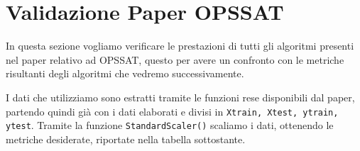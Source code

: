 \section{Validazione Paper OPS\textunderscore SAT}
In questa sezione vogliamo verificare le prestazioni di tutti gli algoritmi presenti nel paper relativo ad OPS\textunderscore SAT, questo per avere un confronto con le metriche risultanti degli algoritmi che vedremo successivamente.

I dati che utilizziamo sono estratti tramite le funzioni rese disponibili dal paper, partendo quindi già con i dati elaborati e divisi in \texttt{X\textunderscore train, X\textunderscore test, y\textunderscore train, y\textunderscore test}.
Tramite la funzione \texttt{StandardScaler()} scaliamo i dati, ottenendo le metriche desiderate, riportate nella tabella sottostante.
\vspace{0.5cm}
